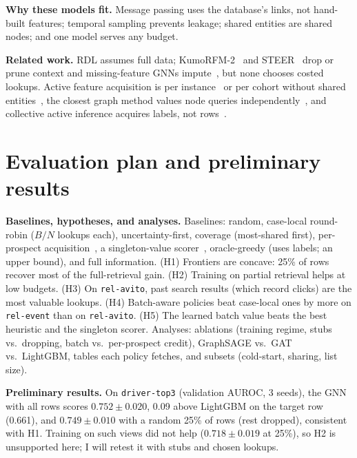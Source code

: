 \documentclass{article}
\begin{document}
\textbf{Why these models fit.} Message passing uses the database's links, not hand-built features; temporal sampling prevents leakage; shared entities are shared nodes; and one model serves any budget.

\textbf{Related work.} RDL assumes full data; KumoRFM-2~\cite{hudovernik2026kumorfm2} and STEER~\cite{mohamed2026steer} drop or prune context and missing-feature GNNs impute~\cite{rossi2022fp}, but none chooses costed lookups. Active feature acquisition is per instance~\cite{norcliffe2025sefa,valancius2024aco,feng2026brig} or per cohort without shared entities~\cite{rheude2025cama}, the closest graph method values node queries independently~\cite{zhou2026scout}, and collective active inference acquires labels, not rows~\cite{bilgic2010active}.

\section{Evaluation plan and preliminary results}

\textbf{Baselines, hypotheses, and analyses.} Baselines: random, case-local round-robin ($B/N$ lookups each), uncertainty-first, coverage (most-shared first), per-prospect acquisition~\cite{norcliffe2025sefa,valancius2024aco}, a singleton-value scorer~\cite{zhou2026scout}, oracle-greedy (uses labels; an upper bound), and full information. (H1) Frontiers are concave: 25\% of rows recover most of the full-retrieval gain. (H2) Training on partial retrieval helps at low budgets. (H3) On \texttt{rel-avito}, past search results (which record clicks) are the most valuable lookups. (H4) Batch-aware policies beat case-local ones by more on \texttt{rel-event} than on \texttt{rel-avito}. (H5) The learned batch value beats the best heuristic and the singleton scorer. Analyses: ablations (training regime, stubs vs.\ dropping, batch vs.\ per-prospect credit), GraphSAGE vs.\ GAT vs.\ LightGBM, tables each policy fetches, and subsets (cold-start, sharing, list size).

\textbf{Preliminary results.} On \texttt{driver-top3} (validation AUROC, 3 seeds), the GNN with all rows scores $0.752 \pm 0.020$, 0.09 above LightGBM on the target row (0.661), and $0.749 \pm 0.010$ with a random 25\% of rows (rest dropped), consistent with H1. Training on such views did not help ($0.718 \pm 0.019$ at 25\%), so H2 is unsupported here; I will retest it with stubs and chosen lookups.

\small


\end{document}
